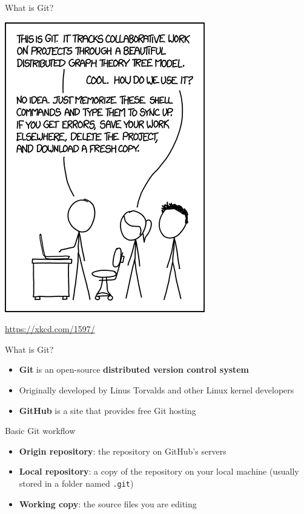 \begin{frame}{What is Git?}
    \pause
    \begin{center}
        \includegraphics[height=0.7\textheight]{xkcd1597}
        
        {\tiny\url{https://xkcd.com/1597/}}
    \end{center}
\end{frame}

\begin{frame}{What is Git?}
    \begin{itemize}
        \item \textbf{Git} is an open-source \textbf{distributed version control system} \pause
        \item Originally developed by Linus Torvalds and other Linux kernel developers \pause
        \item \textbf{GitHub} is a site that provides free Git hosting
    \end{itemize}
\end{frame}

\begin{frame}{Basic Git workflow}
    \begin{itemize}
        \item \textbf{Origin repository}: the repository on GitHub's servers \pause
        \item \textbf{Local repository}: a copy of the repository on your local machine
            (usually stored in a folder named \texttt{.git}) \pause
        \item \textbf{Working copy}: the source files you are editing
    \end{itemize}
\end{frame}

